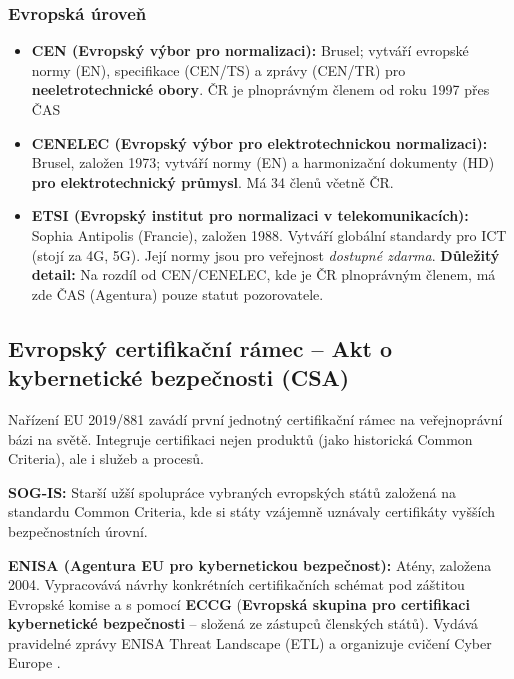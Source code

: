 \documentclass[10pt,a4paper]{article}
\begin{document}
	\subsubsection*{Evropská úroveň}
	\begin{itemize}
		\item \textbf{CEN (Evropský výbor pro normalizaci):} 
		Brusel; vytváří evropské normy (EN), specifikace (CEN/TS) a zprávy (CEN/TR) pro \textbf{neeletrotechnické obory}. ČR je plnoprávným členem od roku 1997 přes ČAS
		
		\item \textbf{CENELEC (Evropský výbor pro elektrotechnickou normalizaci):} 
		Brusel, založen 1973; vytváří normy (EN) a harmonizační dokumenty (HD) \textbf{pro elektrotechnický průmysl}. Má 34 členů včetně ČR.
		
		\item \textbf{ETSI (Evropský institut pro normalizaci v telekomunikacích):} 
		Sophia Antipolis (Francie), založen 1988. Vytváří globální standardy pro ICT (stojí za 4G, 5G).
		Její normy jsou pro veřejnost \textit{dostupné zdarma}. 
		\textbf{Důležitý detail:} Na rozdíl od CEN/CENELEC, kde je ČR plnoprávným členem, má zde ČAS (Agentura) pouze statut pozorovatele.
	\end{itemize}
					
	\subsection{Evropský certifikační rámec – Akt o kybernetické bezpečnosti (CSA)}
	Nařízení EU 2019/881 zavádí první jednotný certifikační rámec na veřejnoprávní bázi na světě. 
	Integruje certifikaci nejen produktů (jako historická Common Criteria), ale i služeb a procesů.  
	
	\textbf{SOG-IS:} Starší užší spolupráce vybraných evropských států založená na standardu Common Criteria, kde si státy vzájemně uznávaly certifikáty vyšších bezpečnostních úrovní.
	
	\textbf{ENISA (Agentura EU pro kybernetickou bezpečnost):} Atény, založena 2004. Vypracovává návrhy konkrétních certifikačních schémat pod záštitou Evropské komise a s pomocí \textbf{ECCG} (\textbf{Evropská skupina pro certifikaci kybernetické bezpečnosti} – složená ze zástupců členských států). Vydává pravidelné zprávy ENISA Threat Landscape (ETL) a organizuje cvičení Cyber Europe .
			
\end{document}
